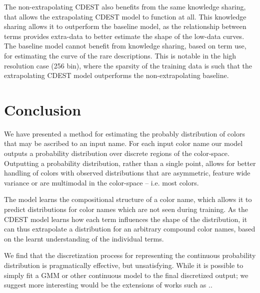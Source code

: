 \documentclass[11pt,a4paper]{article}
\newcommand{\textcite}{\citet}
\begin{document}
The non-extrapolating CDEST also benefits from the same knowledge sharing, that allows the extrapolating CDEST model to function at all.
This knowledge sharing allows it to outperform the baseline model, as the relationship between terms provides extra-data to better estimate the shape of the low-data curves.
The baseline model cannot benefit from knowledge sharing, based on term use, for estimating the curve of the rare descriptions.
This is notable in the high resolution case (256 bin),
where the sparsity of the training data is such that the extrapolating CDEST model outperforms the non-extrapolating baseline.




\section{Conclusion}\label{sec:conclusion}
We have presented a method for estimating the probably distribution of colors that may be ascribed to an input name.
For each input color name our model outputs a probability distribution over discrete regions of the color-space.
Outputting a probability distribution, rather than a single point, allows for better handling of colors with observed distributions that are asymmetric, feature wide variance or are multimodal in the color-space -- i.e. most colors.

The model learns the compositional structure of a color name, which allows it to predict distributions for color names which are not seen during training.
As the CDEST model learns how each term influences the shape of the distribution, it can thus extrapolate a distribution for
 an arbitrary compound color names, based on the learnt understanding of the individual terms.

We find that the discretization process for representing the continuous probability distribution is pragmatically effective, but unsatisfying.
While it is possible to simply fit a GMM or other continuous model to the final discretized output;
we suggest more interesting would be the extensions of works such as \textcite{1998NNpdfDiffCdf, likas2001probability, 2017arXivKernalMixtureNetworks}..



\clearpage


%
\end{document}
